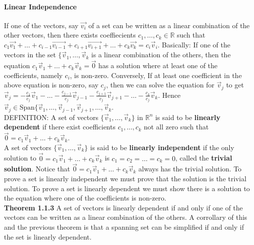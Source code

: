 \documentclass[10pt,letter]{article}
\begin{document}
\paragraph{Linear Independence} If one of the vectors, say $\vec{v_i}$ of a set can be written as a linear combination of the other vectors, then there exists coeffiecients $c_1,\ldots,c_k\in\mathbb{R}$ such that $c_1\vec{v_1}+\ldots+c_{i-1}\vec{v_{i-1}}+c_{i+1}\vec{v_{i+1}}+\ldots+c_k\vec{v_k}=c_i\vec{v}_i$. Basically: If one of the vectors in the set $\{\vec{v}_1,\ldots,\vec{v}_k$ is a linear combination of the others, then the equation $c_1\vec{v}_1+\ldots+c_k\vec{v}_k=\vec{0}$ has a solution where at least one of the coefficients, namely $c_i$, is non-zero. Conversely, If at least one coefficient in the above equation is non-zero, say $c_j$, then we can solve the equation for $\vec{v}_j$ to get $\vec{v}_j=-\frac{c_1}{c_j}\vec{v}_1-\ldots-\frac{c_{j-1}}{c_j}\vec{v}_{j-1}-\frac{c_{j+1}}{c_j}\vec{v}_{j+1}-\ldots-\frac{c_k}{c_j}\vec{v}_k$. Hence $\vec{v}_j\in\text{Span}\{\vec{v}_1,\ldots,\vec{v}_{j-1},\vec{v}_{j+1},\ldots, \vec{v}_k$. \\ 
DEFINITION: A set of vectors $\{\vec{v}_1,\ldots,\vec{v}_k\}$ in $\mathbb{R}^n$ is said to be \textbf{linearly dependent} if there exist coefficients $c_1,\ldots,c_k$ not all zero such that $\vec{0}=c_1\vec{v}_1+\ldots+c_k\vec{v}_k$. \\ 
A set of vectors $\{\vec{v}_1,\ldots,\vec{v}_k\}$ is said to be \textbf{linearly independent} if the only solution to $\vec{0}=c_1\vec{v}_1+\ldots+c_k\vec{v}_k$ is $c_1=c_2=\ldots=c_k=0$, called the \textbf{trivial solution}. Notice that $\vec{0}=c_1\vec{v}_1+\ldots+c_k\vec{v}_k$ always has the trivial solution. To prove a set is linearly independent we must prove that the  solution is the trivial solution. To prove a set is linearly dependent we must show there is a solution to the equation where one of the coefficients is non-zero. \\ 
\textbf{Theorem 1.1.3} A set of vectors is linearly dependent if and only if one of the vectors can be written as a linear combination of the others. A corrollary of this and the previous theorem is that a spanning set can be simplified if and only if the set is linearly dependent. \\ 
\end{document}
